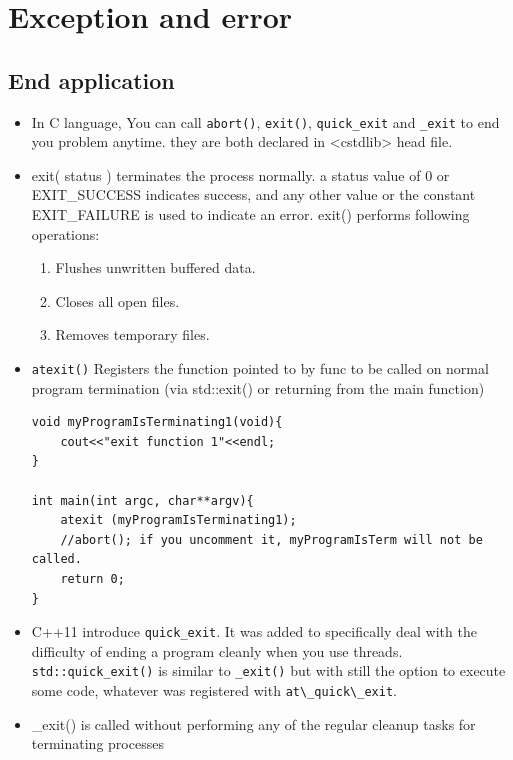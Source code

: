 \documentclass[a4paper,11pt,twoside]{book}
\begin{document}
\chapter{Exception and error}

\section{End application}
\begin{itemize}
	\item In C language, You can call \texttt{abort()}, \texttt{exit()}, \texttt{quick\_exit} and  \texttt{\_exit} to end you problem anytime. they are both declared in <cstdlib> head file.
	
	\item exit( status ) terminates the process normally.
	a status value of 0 or EXIT\_SUCCESS indicates success, and any other value or the constant EXIT\_FAILURE is used to indicate an error. exit() performs following operations:
	\begin{enumerate}
		\item Flushes unwritten buffered data.
		\item Closes all open files.
		\item Removes temporary files.
	\end{enumerate}
	
	\item \texttt{atexit()} Registers the function pointed to by func to be called on normal program termination (via std::exit() or returning from the main function)
\begin{lstlisting}[numbers=none]
void myProgramIsTerminating1(void){
	cout<<"exit function 1"<<endl;
}
	
int main(int argc, char**argv){
	atexit (myProgramIsTerminating1);
	//abort(); if you uncomment it, myProgramIsTerm will not be called.
	return 0;
}
\end{lstlisting}
	
	\item C++11 introduce \texttt{quick\_exit}. It was added to specifically deal with the difficulty of ending a program cleanly when you use threads. \texttt{std::quick\_exit()} is similar to \texttt{\_exit()} but with still the option to execute some code, whatever was registered with \verb=at\_quick\_exit=.
	
	\item \_exit() is called without performing any of the regular cleanup tasks for terminating processes
	

\end{itemize}
\end{document}
